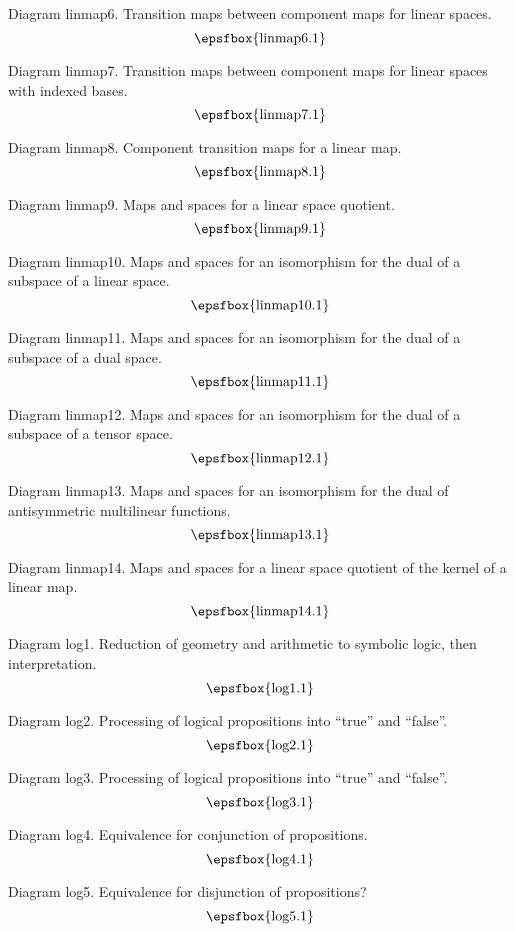 Diagram linmap6. Transition maps between component maps for linear spaces.
$$
\centerline{\epsfbox{linmap6.1}}
$$

Diagram linmap7. Transition maps between component maps for linear spaces with
indexed bases.
$$
\centerline{\epsfbox{linmap7.1}}
$$

\filleject

Diagram linmap8. Component transition maps for a linear map.
$$
\centerline{\epsfbox{linmap8.1}}
$$

Diagram linmap9. Maps and spaces for a linear space quotient.
$$
\centerline{\epsfbox{linmap9.1}}
$$

Diagram linmap10. Maps and spaces for an isomorphism for the dual of a subspace
of a linear space.
$$
\centerline{\epsfbox{linmap10.1}}
$$

Diagram linmap11. Maps and spaces for an isomorphism for the dual of a subspace
of a dual space.
$$
\centerline{\epsfbox{linmap11.1}}
$$

\filleject

Diagram linmap12. Maps and spaces for an isomorphism for the dual of a subspace
of a tensor space.
$$
\centerline{\epsfbox{linmap12.1}}
$$

Diagram linmap13. Maps and spaces for an isomorphism for the dual of
antisymmetric multilinear functions.
$$
\centerline{\epsfbox{linmap13.1}}
$$

Diagram linmap14. Maps and spaces for a linear space quotient of the kernel of a
linear map.
$$
\centerline{\epsfbox{linmap14.1}}
$$

\secteject
\edef\SECTlog{\the\pageno}

Diagram log1. Reduction of geometry and arithmetic to symbolic logic, then
interpretation.
$$
\centerline{\epsfbox{log1.1}}
$$

Diagram log2. Processing of logical propositions into ``true'' and ``false''.
$$
\centerline{\epsfbox{log2.1}}
$$

Diagram log3. Processing of logical propositions into ``true'' and ``false''.
$$
\centerline{\epsfbox{log3.1}}
$$

Diagram log4. Equivalence for conjunction of propositions.
$$
\centerline{\epsfbox{log4.1}}
$$

Diagram log5. Equivalence for disjunction of propositions?
$$
\centerline{\epsfbox{log5.1}}
$$

